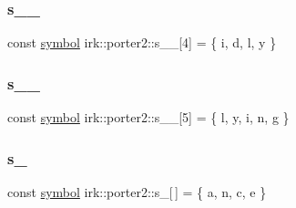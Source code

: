 \mbox{\label{namespaceirk_1_1porter2_afc930bb9ae5f01a19b24669ad2e58686}} 
\subsubsection{\texorpdfstring{s\+\_\+\_}{s\_10\_8}}
{\footnotesize\ttfamily const \mbox{\hyperlink{namespaceirk_1_1porter2_afd04c4eb58a1dabcf8f3ab2d7e9f9ed5}{symbol}} irk\+::porter2\+::s\+\_\+\_\mbox{[}4\mbox{]} = \{ \textquotesingle{}i\textquotesingle{}, \textquotesingle{}d\textquotesingle{}, \textquotesingle{}l\textquotesingle{}, \textquotesingle{}y\textquotesingle{} \}\hspace{0.3cm}{\ttfamily [static]}}

\mbox{\label{namespaceirk_1_1porter2_a209afcf6a26c301e27373ef512be74f5}} 
\subsubsection{\texorpdfstring{s\+\_\+\_}{s\_10\_9}}
{\footnotesize\ttfamily const \mbox{\hyperlink{namespaceirk_1_1porter2_afd04c4eb58a1dabcf8f3ab2d7e9f9ed5}{symbol}} irk\+::porter2\+::s\+\_\+\_\mbox{[}5\mbox{]} = \{ \textquotesingle{}l\textquotesingle{}, \textquotesingle{}y\textquotesingle{}, \textquotesingle{}i\textquotesingle{}, \textquotesingle{}n\textquotesingle{}, \textquotesingle{}g\textquotesingle{} \}\hspace{0.3cm}{\ttfamily [static]}}

\mbox{\label{namespaceirk_1_1porter2_ab2135b252edb06be3233766094481046}} 
\subsubsection{\texorpdfstring{s\+\_}{s\_11}}
{\footnotesize\ttfamily const \mbox{\hyperlink{namespaceirk_1_1porter2_afd04c4eb58a1dabcf8f3ab2d7e9f9ed5}{symbol}} irk\+::porter2\+::s\+\_\mbox{[}$\,$\mbox{]} = \{ \textquotesingle{}a\textquotesingle{}, \textquotesingle{}n\textquotesingle{}, \textquotesingle{}c\textquotesingle{}, \textquotesingle{}e\textquotesingle{} \}\hspace{0.3cm}{\ttfamily [static]}}

